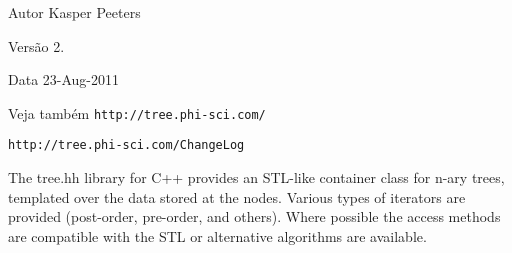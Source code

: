\begin{DoxyAuthor}{Autor}
Kasper Peeters 
\end{DoxyAuthor}
\begin{DoxyVersion}{Versão}
2. 
\end{DoxyVersion}
\begin{DoxyDate}{Data}
23-\/\+Aug-\/2011 
\end{DoxyDate}
\begin{DoxySeeAlso}{Veja também}
{\tt http\+://tree.\+phi-\/sci.\+com/} 

{\tt http\+://tree.\+phi-\/sci.\+com/\+Change\+Log}
\end{DoxySeeAlso}
The tree.\+hh library for C++ provides an S\+T\+L-\/like container class for n-\/ary trees, templated over the data stored at the nodes. Various types of iterators are provided (post-\/order, pre-\/order, and others). Where possible the access methods are compatible with the S\+TL or alternative algorithms are available. 